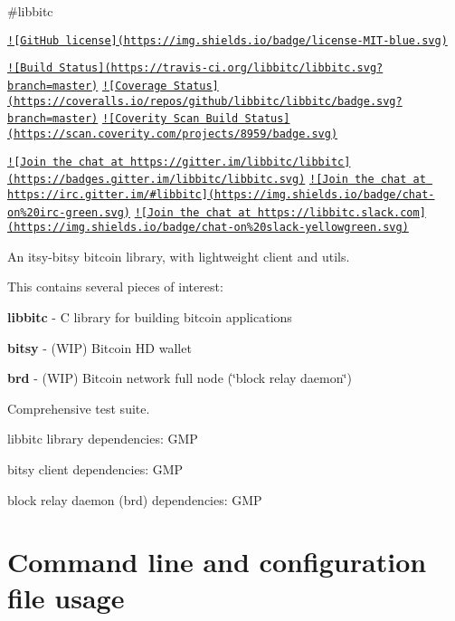 \#libbitc

\href{https://raw.githubusercontent.com/libbitc/libbitc/master/COPYING}{\tt !\mbox{[}Git\-Hub license\mbox{]}(https\-://img.\-shields.\-io/badge/license-\/\-M\-I\-T-\/blue.\-svg)}

\href{https://travis-ci.org/libbitc/libbitc}{\tt !\mbox{[}Build Status\mbox{]}(https\-://travis-\/ci.\-org/libbitc/libbitc.\-svg?branch=master)} \href{https://coveralls.io/github/libbitc/libbitc?branch=master}{\tt !\mbox{[}Coverage Status\mbox{]}(https\-://coveralls.\-io/repos/github/libbitc/libbitc/badge.\-svg?branch=master)} \href{https://scan.coverity.com/projects/libbitc-libbitc}{\tt !\mbox{[}Coverity Scan Build Status\mbox{]}(https\-://scan.\-coverity.\-com/projects/8959/badge.\-svg)}

\href{https://gitter.im/libbitc/libbitc?utm_source=badge&utm_medium=badge&utm_campaign=pr-badge&utm_content=badge}{\tt !\mbox{[}Join the chat at https\-://gitter.\-im/libbitc/libbitc\mbox{]}(https\-://badges.\-gitter.\-im/libbitc/libbitc.\-svg)} \href{https://irc.gitter.im/}{\tt !\mbox{[}Join the chat at https\-://irc.\-gitter.\-im/\#libbitc\mbox{]}(https\-://img.\-shields.\-io/badge/chat-\/on\%20irc-\/green.\-svg)} \href{https://libbitc.slack.com}{\tt !\mbox{[}Join the chat at https\-://libbitc.\-slack.\-com\mbox{]}(https\-://img.\-shields.\-io/badge/chat-\/on\%20slack-\/yellowgreen.\-svg)}

An itsy-\/bitsy bitcoin library, with lightweight client and utils.

This contains several pieces of interest\-:
\begin{DoxyItemize}
\item {\bfseries libbitc} -\/ C library for building bitcoin applications
\item {\bfseries bitsy} -\/ (W\-I\-P) Bitcoin H\-D wallet
\item {\bfseries brd} -\/ (W\-I\-P) Bitcoin network full node (\char`\"{}block relay daemon\char`\"{})
\item Comprehensive test suite.
\end{DoxyItemize}

libbitc library dependencies\-: G\-M\-P

bitsy client dependencies\-: G\-M\-P

block relay daemon (brd) dependencies\-: G\-M\-P

\section*{Command line and configuration file usage }

